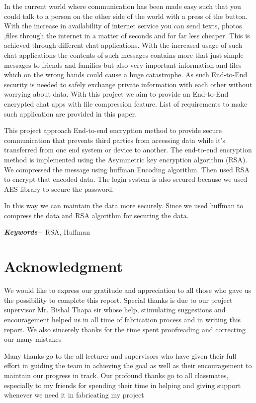 In the current world where communication has been made easy such that you could talk to a person on the other side of the world with a press of the button. With the increase in availability of internet service you can send texts, photos ,files through the internet in a matter of seconds and for far less cheaper. This is achieved through different chat applications. With the increased usage of such chat applications the contents of such messages contains more that just simple messages to friends and families but also very important information and files which on the wrong hands could cause a huge catastrophe. As such End-to-End security is needed to safely exchange private information with each other without worrying about data. With this project we aim to provide an End-to-End encrypted chat apps with file compression feature. List of requirements to make such application are provided in this paper.

This project approach End-to-end encryption method to provide  secure communication that prevents third parties from accessing data while it's transferred from one end system or device to another.
The end-to-end encryption method is implemented using the Asymmetric key encryption algorithm (RSA). We compressed the message using huffman Encoding algorithm. Then used RSA to encrypt that encoded data. The login system is also secured because we used AES library to secure the password.

In this way we can maintain the data more securely. 
Since we used huffman to compress the data and RSA algorithm for securing the data. 
 
\par
\textbf{\textit{Keywords$-$}} RSA, Huffman

\chapter*{Acknowledgment}
We would like to express our gratitude and appreciation to all those who 
gave us the possibility to complete this report. Special thanks is due to our project 
supervisor Mr. Bishal Thapa sir whose help, stimulating suggestions 
and encouragement helped us in all time of fabrication process and in writing 
this report. We also sincerely thanks for the time spent proofreading and correcting 
our many mistakes\par
Many thanks go to the all lecturer and supervisors who have given their 
full effort in guiding the team in achieving the goal as well as their 
encouragement to maintain our progress in track. Our profound thanks go to all 
classmates, especially to my friends for spending their time in helping and 
giving support whenever we need it in fabricating my project\par
\begin{flushright}
\vskip -20pt
\submittedBy
\end{flushright}

